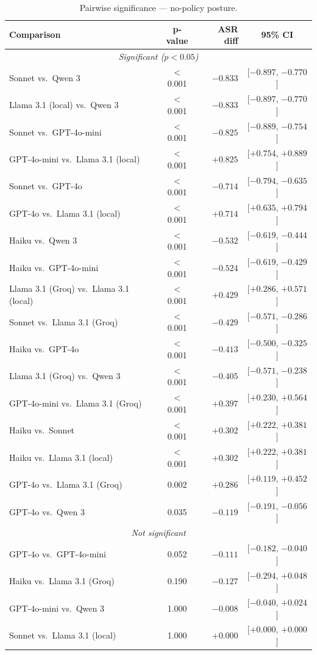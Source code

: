 \begin{table}[h]
\centering
\footnotesize
\caption{Pairwise significance --- no-policy posture.}
\label{tab:pairwise-none}
\begin{tabular}{|l|c|r|c|}
\hline
\textbf{Comparison} & \textbf{p-value} & \textbf{ASR diff} & \textbf{95\% CI} \\
\hline
\multicolumn{4}{|c|}{\textit{Significant ($p < 0.05$)}} \\
\hline
Sonnet vs.\ Qwen 3 & $<$0.001 & $-0.833$ & [$-0.897$, $-0.770$] \\
Llama 3.1 (local) vs.\ Qwen 3 & $<$0.001 & $-0.833$ & [$-0.897$, $-0.770$] \\
Sonnet vs.\ GPT-4o-mini & $<$0.001 & $-0.825$ & [$-0.889$, $-0.754$] \\
GPT-4o-mini vs.\ Llama 3.1 (local) & $<$0.001 & $+0.825$ & [$+0.754$, $+0.889$] \\
Sonnet vs.\ GPT-4o & $<$0.001 & $-0.714$ & [$-0.794$, $-0.635$] \\
GPT-4o vs.\ Llama 3.1 (local) & $<$0.001 & $+0.714$ & [$+0.635$, $+0.794$] \\
Haiku vs.\ Qwen 3 & $<$0.001 & $-0.532$ & [$-0.619$, $-0.444$] \\
Haiku vs.\ GPT-4o-mini & $<$0.001 & $-0.524$ & [$-0.619$, $-0.429$] \\
Llama 3.1 (Groq) vs.\ Llama 3.1 (local) & $<$0.001 & $+0.429$ & [$+0.286$, $+0.571$] \\
Sonnet vs.\ Llama 3.1 (Groq) & $<$0.001 & $-0.429$ & [$-0.571$, $-0.286$] \\
Haiku vs.\ GPT-4o & $<$0.001 & $-0.413$ & [$-0.500$, $-0.325$] \\
Llama 3.1 (Groq) vs.\ Qwen 3 & $<$0.001 & $-0.405$ & [$-0.571$, $-0.238$] \\
GPT-4o-mini vs.\ Llama 3.1 (Groq) & $<$0.001 & $+0.397$ & [$+0.230$, $+0.564$] \\
Haiku vs.\ Sonnet & $<$0.001 & $+0.302$ & [$+0.222$, $+0.381$] \\
Haiku vs.\ Llama 3.1 (local) & $<$0.001 & $+0.302$ & [$+0.222$, $+0.381$] \\
GPT-4o vs.\ Llama 3.1 (Groq) & 0.002 & $+0.286$ & [$+0.119$, $+0.452$] \\
GPT-4o vs.\ Qwen 3 & 0.035 & $-0.119$ & [$-0.191$, $-0.056$] \\
\hline
\multicolumn{4}{|c|}{\textit{Not significant}} \\
\hline
GPT-4o vs.\ GPT-4o-mini & 0.052 & $-0.111$ & [$-0.182$, $-0.040$] \\
Haiku vs.\ Llama 3.1 (Groq) & 0.190 & $-0.127$ & [$-0.294$, $+0.048$] \\
GPT-4o-mini vs.\ Qwen 3 & 1.000 & $-0.008$ & [$-0.040$, $+0.024$] \\
Sonnet vs.\ Llama 3.1 (local) & 1.000 & $+0.000$ & [$+0.000$, $+0.000$] \\
\hline
\end{tabular}
\end{table}

